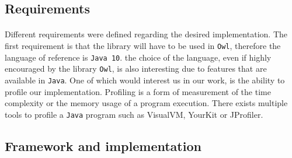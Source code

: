 \documentclass[11pt,a4paper]{article}
\theoremstyle{definition}
\begin{document}
\subsection{Requirements}

\paragraph{}


Different requirements were defined regarding the desired implementation.
The first requirement is that the library will have to be used in
\texttt{Owl}, therefore the language of reference is \texttt{Java 10}.
the choice of the language, even if highly encouraged by
the library \texttt{Owl}, is also interesting due to features that
are available in \texttt{Java}. One of which would interest us
in our work, is the ability to profile our implementation.
Profiling is a form of measurement of the time complexity or
the memory usage of a program execution. There exists multiple
tools to profile a \texttt{Java} program such as VisualVM, YourKit
or JProfiler.

%
%
%


\subsection{Framework and implementation}

\paragraph{}
\end{document}
